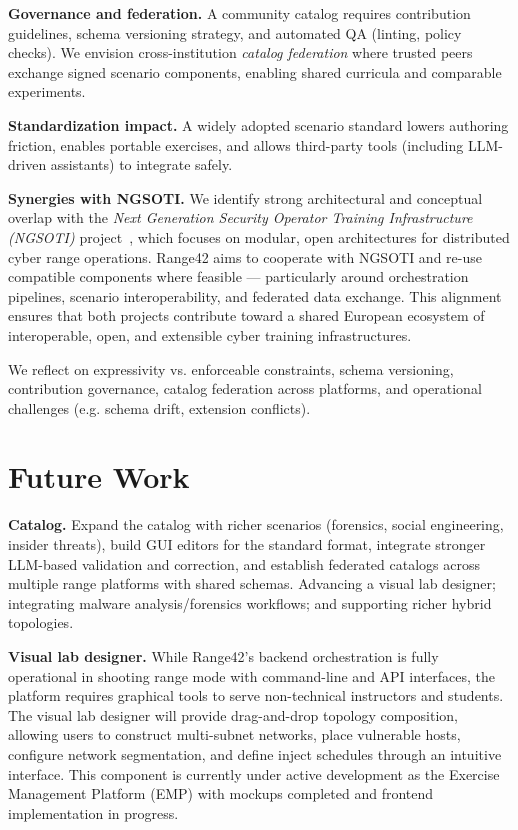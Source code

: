 \documentclass[11pt]{article}
\begin{document}
\textbf{Governance and federation.} A community catalog requires contribution guidelines, schema versioning strategy, and automated QA (linting, policy checks).
We envision cross-institution \emph{catalog federation} where trusted peers exchange signed scenario components, enabling shared curricula and comparable experiments.

\textbf{Standardization impact.} A widely adopted scenario standard lowers authoring friction, enables portable exercises, and allows third-party tools (including LLM-driven assistants) to integrate safely.

\textbf{Synergies with NGSOTI.} 
We identify strong architectural and conceptual overlap with the \emph{Next Generation Security Operator Training Infrastructure (NGSOTI)} project~\cite{ngsoti}, 
which focuses on modular, open architectures for distributed cyber range operations. 
Range42 aims to cooperate with NGSOTI and re-use compatible components where feasible --- particularly around orchestration pipelines, scenario interoperability, and federated data exchange. 
This alignment ensures that both projects contribute toward a shared European ecosystem of interoperable, open, and extensible cyber training infrastructures.

We reflect on expressivity vs. enforceable constraints, schema versioning, contribution governance, catalog federation across platforms, and operational challenges (e.g. schema drift, extension conflicts).

\section{Future Work}

\textbf{Catalog.}
Expand the catalog with richer scenarios (forensics, social engineering, insider threats), build GUI editors for the standard format, integrate stronger LLM-based validation and correction, and establish federated catalogs across multiple range platforms with shared schemas. Advancing a visual lab designer; integrating malware analysis/forensics workflows; and supporting richer hybrid topologies.

\textbf{Visual lab designer.}
While Range42's backend orchestration is fully operational in shooting range mode with command-line and API interfaces,
the platform requires graphical tools to serve non-technical instructors and students.
The visual lab designer will provide drag-and-drop topology composition, allowing users to construct multi-subnet networks, place vulnerable hosts, configure network segmentation, and define inject schedules through an intuitive interface.
This component is currently under active development as the Exercise Management Platform (EMP) with mockups completed and frontend implementation in progress.
\end{document}
